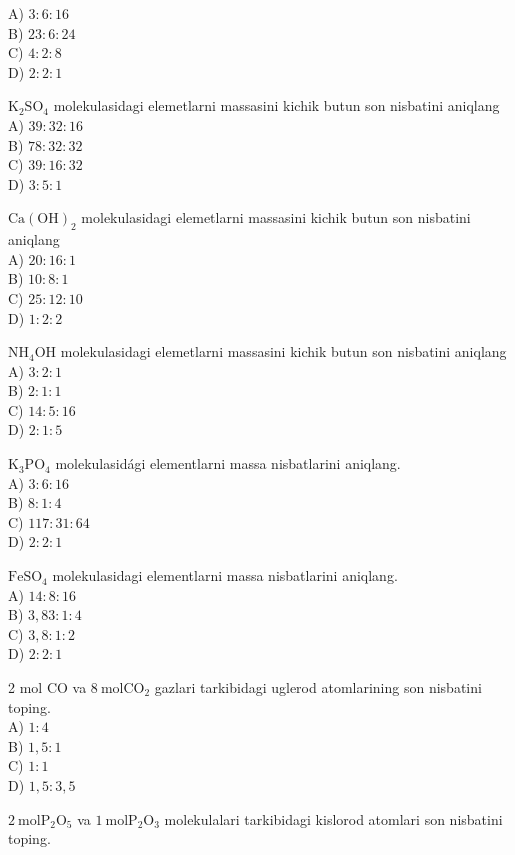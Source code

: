 A) $3: 6: 16$\\
B) $23: 6: 24$\\
C) $4: 2: 8$\\
D) $2: 2: 1$
  \item $\mathrm{K}_{2} \mathrm{SO}_{4}$ molekulasidagi elemetlarni massasini kichik butun son nisbatini aniqlang\\
A) $39: 32: 16$\\
B) $78: 32: 32$\\
C) $39: 16: 32$\\
D) $3: 5: 1$
  \item $\mathrm{Ca}(\mathrm{OH})_{2}$ molekulasidagi elemetlarni massasini kichik butun son nisbatini aniqlang\\
A) $20: 16: 1$\\
B) $10: 8: 1$\\
C) $25: 12: 10$\\
D) $1: 2: 2$
  \item $\mathrm{NH}_{4} \mathrm{OH}$ molekulasidagi elemetlarni massasini kichik butun son nisbatini aniqlang\\
A) $3: 2: 1$\\
B) $2: 1: 1$\\
C) $14: 5: 16$\\
D) $2: 1: 5$
  \item $\mathrm{K}_{3} \mathrm{PO}_{4}$ molekulasidági elementlarni massa nisbatlarini aniqlang.\\
A) $3: 6: 16$\\
B) $8: 1: 4$\\
C) $117: 31: 64$\\
D) $2: 2: 1$
  \item $\mathrm{FeSO}_{4}$ molekulasidagi elementlarni massa nisbatlarini aniqlang.\\
A) $14: 8: 16$\\
B) $3,83: 1: 4$\\
C) $3,8: 1: 2$\\
D) $2: 2: 1$
  \item 2 mol CO va $8 \mathrm{~mol} \mathrm{CO}_{2}$ gazlari tarkibidagi uglerod atomlarining son nisbatini toping.\\
A) $1: 4$\\
B) $1,5: 1$\\
C) $1: 1$\\
D) $1,5: 3,5$
  \item $2 \mathrm{~mol} \mathrm{P}_{2} \mathrm{O}_{5}$ va $1 \mathrm{~mol} \mathrm{P}_{2} \mathrm{O}_{3}$ molekulalari tarkibidagi kislorod atomlari son nisbatini toping.\\
